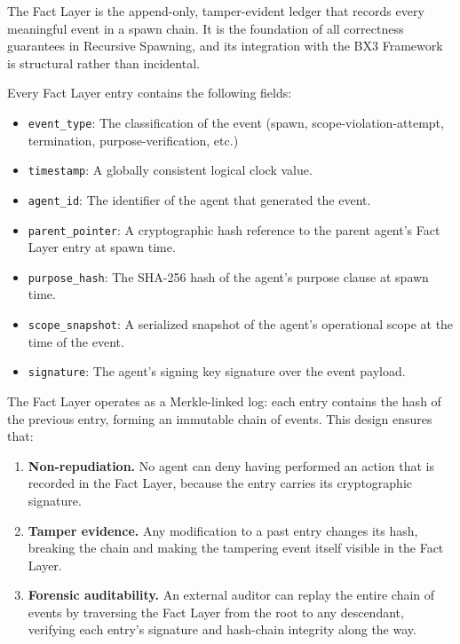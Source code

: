 The Fact Layer is the append-only, tamper-evident ledger that records every meaningful event in a spawn chain. It is the foundation of all correctness guarantees in Recursive Spawning, and its integration with the BX3 Framework is structural rather than incidental.

Every Fact Layer entry contains the following fields:

\begin{itemize}
    \item \texttt{event\_type}: The classification of the event (spawn, scope-violation-attempt, termination, purpose-verification, etc.)
    \item \texttt{timestamp}: A globally consistent logical clock value.
    \item \texttt{agent\_id}: The identifier of the agent that generated the event.
    \item \texttt{parent\_pointer}: A cryptographic hash reference to the parent agent's Fact Layer entry at spawn time.
    \item \texttt{purpose\_hash}: The SHA-256 hash of the agent's purpose clause at spawn time.
    \item \texttt{scope\_snapshot}: A serialized snapshot of the agent's operational scope at the time of the event.
    \item \texttt{signature}: The agent's signing key signature over the event payload.
\end{itemize}

The Fact Layer operates as a Merkle-linked log: each entry contains the hash of the previous entry, forming an immutable chain of events. This design ensures that:

\begin{enumerate}
    \item \textbf{Non-repudiation.} No agent can deny having performed an action that is recorded in the Fact Layer, because the entry carries its cryptographic signature.
    \item \textbf{Tamper evidence.} Any modification to a past entry changes its hash, breaking the chain and making the tampering event itself visible in the Fact Layer.
    \item \textbf{Forensic auditability.} An external auditor can replay the entire chain of events by traversing the Fact Layer from the root to any descendant, verifying each entry's signature and hash-chain integrity along the way.
\end{enumerate}

